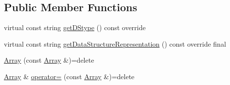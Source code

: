 \subsection*{Public Member Functions}
\begin{DoxyCompactItemize}
\item 
virtual const string \mbox{\hyperlink{classbridges_1_1datastructure_1_1_array_a3b6d694fe5d336a0a15951d522852e51}{get\+D\+Stype}} () const override
\item 
virtual const string \mbox{\hyperlink{classbridges_1_1datastructure_1_1_array_a210de6729fa08715c13d2deb0b141010}{get\+Data\+Structure\+Representation}} () const override final
\item 
\mbox{\hyperlink{classbridges_1_1datastructure_1_1_array_abd017f8feb1d892e8559df6533354d3f}{Array}} (const \mbox{\hyperlink{classbridges_1_1datastructure_1_1_array}{Array}} \&)=delete
\item 
\mbox{\hyperlink{classbridges_1_1datastructure_1_1_array}{Array}} \& \mbox{\hyperlink{classbridges_1_1datastructure_1_1_array_a5ca19edaaf0eeba81f73440384eddeb4}{operator=}} (const \mbox{\hyperlink{classbridges_1_1datastructure_1_1_array}{Array}} \&)=delete
\end{DoxyCompactItemize}
